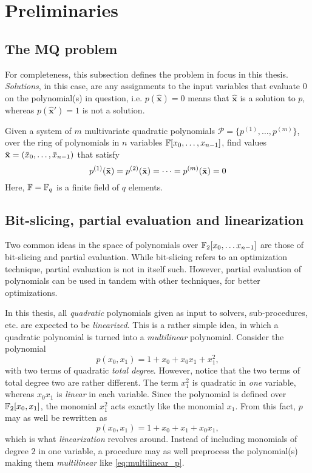 \section{Preliminaries} \label{sec:prereq}
\subsection{The MQ problem} \label{sec:prereq:problem}
For completeness, this subsection defines the problem in focus in this thesis. \textit{Solutions}, in this case, are any assignments to the input variables that evaluate $0$ on the polynomial(s) in question, i.e. $p(\hat{\mathbf{x}}) = 0$ means that $\hat{\mathbf{x}}$ is a solution to $p$, whereas $p(\hat{\mathbf{x}}') = 1$ is not a solution.
\begin{defn}\label{sec1:def:mq}
    Given a system of $m$ multivariate quadratic polynomials $\mathcal{P} = \{p^{(1)}, \dots, p^{(m)}\}$, over the ring of polynomials in $n$ variables $\mathbb{F}[x_0, \dots, x_{n - 1}]$, find values $\Bar{\mathbf{x}} = (\Bar{x}_0, \dots, \Bar{x}_{n - 1})$ that satisfy
    $$
        p^{(1)}(\mathbf{\Bar{\mathbf{x}}}) =  p^{(2)}(\Bar{\mathbf{x}}) = \dots = p^{(m)}(\Bar{\mathbf{x}}) = 0 
    $$
    Here, $\mathbb{F} = \mathbb{F}_q$ is a finite field of $q$ elements. 
\end{defn}

\subsection{Bit-slicing, partial evaluation and linearization}
Two common ideas in the space of polynomials over $\mathbb{F}_2[x_0,\dots x_{n - 1}]$ are those of bit-slicing and partial evaluation. While bit-slicing refers to an optimization technique, partial evaluation is not in itself such. However, partial evaluation of polynomials can be used in tandem with other techniques, for better optimizations.

In this thesis, all \textit{quadratic} polynomials given as input to solvers, sub-procedures, etc. are expected to be \textit{linearized}. This is a rather simple idea, in which a quadratic polynomial is turned into a \textit{multilinear} polynomial. Consider the polynomial
$$
    p(x_0, x_1) = 1 + x_0 + x_0x_1 + x_1^2, 
$$
with two terms of quadratic \textit{total degree}. However, notice that the two terms of total degree two are rather different. The term $x_1^2$ is quadratic in \textit{one} variable, whereas $x_0x_1$ is \textit{linear} in each variable. Since the polynomial is defined over $\mathbb{F}_2[x_0,x_1]$, the monomial $x_1^2$ acts exactly like the monomial $x_1$. From this fact, $p$ may as well be rewritten as 
\begin{equation} \label{eq:multilinear_p}
    p(x_0, x_1) = 1 + x_0 + x_1 + x_0x_1,
\end{equation}
which is what \textit{linearization} revolves around. Instead of including monomials of degree $2$ in one variable, a procedure may as well preprocess the polynomial(s) making them \textit{multilinear} like \cref{eq:multilinear_p}.


